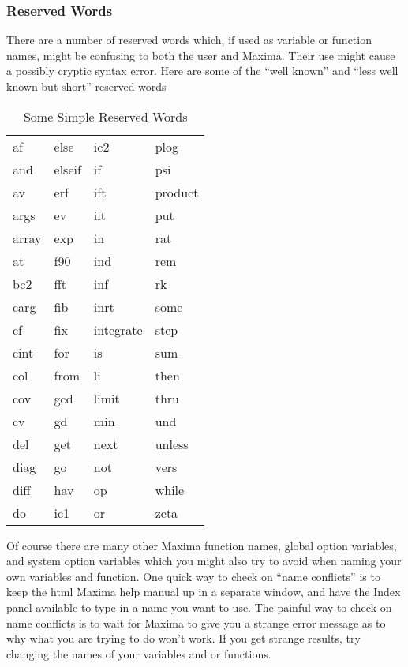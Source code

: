 \documentclass[11pt]{article}
\begin{document}
\subsubsection*{Reserved Words}
There are a number of reserved words which, if used as variable or function names,
  might be confusing to both the user and Maxima.
Their use might cause a possibly cryptic syntax error. 
Here are some of the ``well known'' and ``less well known but short'' reserved words
\small
\begin{table}[h]
\begin{center}
  \begin{tabular}{|p{1in} p{1in} p{1in} p{1in}|}
    \hline
	af & else & ic2 & plog\\
    and & elseif & if &	psi\\
	av & erf & ift & product\\
	args & ev & ilt & put\\
	array & exp & in & rat\\
	at & f90 & ind & rem\\
	bc2 & fft & inf & rk\\
	carg & fib & inrt & some\\
	cf & fix & integrate & step\\
	cint & for & is & sum\\
	col & from & li & then	\\
    cov & gcd & limit & thru\\
	cv & gd & min & und\\
	del & get & next & unless\\
	diag & go & not & vers\\
	diff & hav & op & while\\
	do & ic1 & or &  zeta\\ \hline	
	\end{tabular}  
\caption{Some Simple Reserved Words}
\end{center}
\end{table}
\normalsize  
Of course there are many other Maxima function names, global option variables,
  and system option variables which you might also try to avoid when naming your own
  variables and function.
One quick way to check on ``name conflicts'' is to keep the html Maxima help manual
  up in a separate window, and have the Index panel available to type in a
  name you want to use.
The painful way to check on name conflicts is to wait for Maxima to give you a strange
  error message as to why what you are trying to do won't work.
If you get strange results, try changing the names of your variables and or functions.\\
\end{document}
